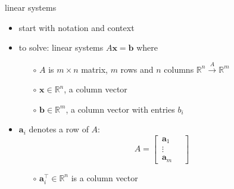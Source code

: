\documentclass[usepdftitle=false,usenames,dvipsnames]{beamer}
\newcommand{\RR}{\mathbb{R}}
\newcommand{\ba}{\mathbf{a}}
\newcommand{\bb}{\mathbf{b}}
\newcommand{\bx}{\mathbf{x}}
\begin{document}
\begin{frame}{linear systems}

\begin{itemize}
\item start with notation and context
\item to solve: linear systems $A \bx = \bb$ where
    \begin{itemize}
    \item[$\circ$] $A$ is $m\times n$ matrix, $m$ rows and $n$ columns \hfill $\RR^n \stackrel{A}{\to} \RR^m$
    \item[$\circ$] $\bx \in \RR^n$, a column vector
    \item[$\circ$] $\bb \in \RR^m$, a column vector with entries $b_i$
    \end{itemize}
\item $\ba_i$ denotes a \alert{row} of $A$:
    $$A = \left[\begin{array}{c} \, \ba_1 \quad \\ \hline
                                 \, \vdots \quad \\ \hline
                                 \, \ba_m \quad \end{array}\right]$$

    \begin{itemize}
    \item[$\circ$] $\ba_i^\top \in \RR^n$ is a column vector
    \end{itemize}
\end{itemize}
\end{frame}
\end{document}
